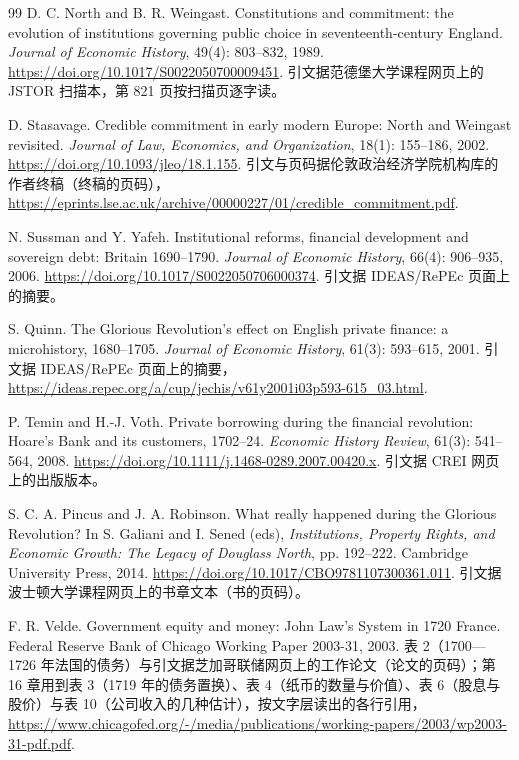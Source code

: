 \begin{thebibliography}{99}
 D. C. North and B. R. Weingast. Constitutions and commitment: the evolution of institutions governing public choice in seventeenth-century England. \emph{Journal of Economic History}, 49(4): 803--832, 1989. \url{https://doi.org/10.1017/S0022050700009451}. 引文据范德堡大学课程网页上的 JSTOR 扫描本，第 821 页按扫描页逐字读。

 D. Stasavage. Credible commitment in early modern Europe: North and Weingast revisited. \emph{Journal of Law, Economics, and Organization}, 18(1): 155--186, 2002. \url{https://doi.org/10.1093/jleo/18.1.155}. 引文与页码据伦敦政治经济学院机构库的作者终稿（终稿的页码），\url{https://eprints.lse.ac.uk/archive/00000227/01/credible_commitment.pdf}.

 N. Sussman and Y. Yafeh. Institutional reforms, financial development and sovereign debt: Britain 1690--1790. \emph{Journal of Economic History}, 66(4): 906--935, 2006. \url{https://doi.org/10.1017/S0022050706000374}. 引文据 IDEAS/RePEc 页面上的摘要。

 S. Quinn. The Glorious Revolution's effect on English private finance: a microhistory, 1680--1705. \emph{Journal of Economic History}, 61(3): 593--615, 2001. 引文据 IDEAS/RePEc 页面上的摘要，\url{https://ideas.repec.org/a/cup/jechis/v61y2001i03p593-615_03.html}.

 P. Temin and H.-J. Voth. Private borrowing during the financial revolution: Hoare's Bank and its customers, 1702--24. \emph{Economic History Review}, 61(3): 541--564, 2008. \url{https://doi.org/10.1111/j.1468-0289.2007.00420.x}. 引文据 CREI 网页上的出版版本。

 S. C. A. Pincus and J. A. Robinson. What really happened during the Glorious Revolution? In S. Galiani and I. Sened (eds), \emph{Institutions, Property Rights, and Economic Growth: The Legacy of Douglass North}, pp. 192--222. Cambridge University Press, 2014. \url{https://doi.org/10.1017/CBO9781107300361.011}. 引文据波士顿大学课程网页上的书章文本（书的页码）。

 F. R. Velde. Government equity and money: John Law's System in 1720 France. Federal Reserve Bank of Chicago Working Paper 2003-31, 2003. 表 2（1700—1726 年法国的债务）与引文据芝加哥联储网页上的工作论文（论文的页码）；第 16 章用到表 3（1719 年的债务置换）、表 4（纸币的数量与价值）、表 6（股息与股价）与表 10（公司收入的几种估计），按文字层读出的各行引用，\url{https://www.chicagofed.org/-/media/publications/working-papers/2003/wp2003-31-pdf.pdf}.


\end{thebibliography}
